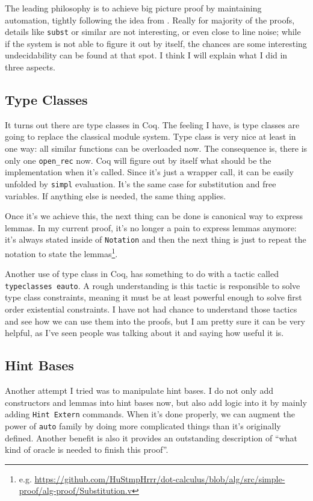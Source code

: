 \documentclass{article}
\theoremstyle{definition}
\begin{document}
The leading philosophy is to achieve big picture proof by maintaining automation,
tightly following the idea from \cite{cpdt}. Really for majority of the proofs,
details like \texttt{subst} or similar are not interesting, or even close to line
noise; while if the system is not able to figure it out by itself, the chances are
some interesting undecidability can be found at that spot. I think I will explain what
I did in three aspects.

\subsection{Type Classes}

It turns out there are type classes in
Coq\cite{10.1007/978-3-540-71067-7_23}\cite{tycls}. The feeling I have, is type
classes are going to replace the classical module system. Type class is very nice at
least in one way: all similar functions can be overloaded now. The consequence is,
there is only one \texttt{open\_rec} now. Coq will figure out by itself what should be
the implementation when it's called. Since it's just a wrapper call, it can be easily
unfolded by \texttt{simpl} evaluation. It's the same case for substitution and free
variables. If anything else is needed, the same thing applies.

Once it's we achieve this, the next thing can be done is canonical way to express
lemmas. In my current proof, it's no longer a pain to express lemmas anymore: it's
always stated inside of \texttt{Notation} and then the next thing is just to repeat
the notation to state the
lemmas\footnote{e.g. \url{https://github.com/HuStmpHrrr/dot-calculus/blob/alg/src/simple-proof/alg-proof/Substitution.v}}.

Another use of type class in Coq, has something to do with a tactic called
\texttt{typeclasses eauto}\cite[20.6.5]{tycls}. A rough understanding is this tactic
is responsible to solve type class constraints, meaning it must be at least powerful
enough to solve first order existential constraints. I have not had chance to
understand those tactics and see how we can use them into the proofs, but I am pretty
sure it can be very helpful, as I've seen people was talking about it and saying how
useful it is.

\subsection{Hint Bases}

Another attempt I tried was to manipulate hint bases. I do not only add constructors
and lemmas into hint bases now, but also add logic into it by mainly adding
\texttt{Hint Extern} commands. When it's done properly, we can augment the power of
\texttt{auto} family by doing more complicated things than it's originally
defined. Another benefit is also it provides an outstanding description of ``what kind
of oracle is needed to finish this proof''.
\end{document}
